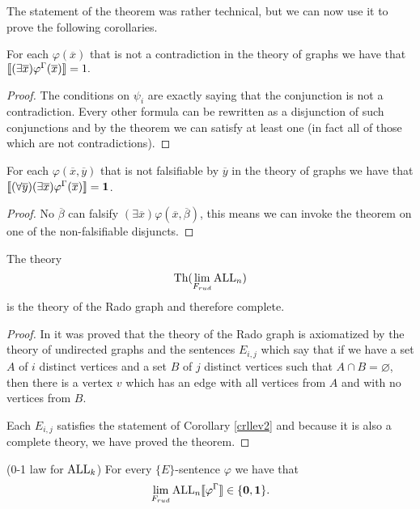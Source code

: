 The statement of the theorem was rather technical, but we can now use it to prove the following corollaries.

\begin{crll}For each $\varphi(\overline x)$ that is not a contradiction in the theory of graphs we have that $\llbracket(\exists \overline x)\varphi^\Gamma(\overline x)\rrbracket=1.$
\end{crll}
\begin{proof}
The conditions on $\psi_i$ are exactly saying that the conjunction is not a contradiction. Every other formula can be rewritten as a disjunction of such conjunctions and by the theorem we can satisfy at least one (in fact all of those which are not contradictions).
\end{proof}
\begin{crll}\label{crllev2}
For each $\varphi(\overline x,\overline y)$ that is not falsifiable by $\overline y$ in the theory of graphs we have that $\llbracket(\forall \overline y)(\exists \overline x)\varphi^\Gamma(\overline x)\rrbracket=\textbf{1}$.
\end{crll}
\begin{proof}
No $\overline \beta$ can falsify $(\exists \overline x)\varphi(\overline x,\overline \beta)$, this means we can invoke the theorem on one of the non-falsifiable disjuncts.
\end{proof}

\begin{thrm}\label{thrmall}
The theory \[\text{Th}(\lim_{F_{rud}}\text{ALL}_n)\] is the theory of the Rado graph and therefore complete.
\end{thrm}
\begin{proof}
In \cite{gaifman1964rado} it was proved that the theory of the Rado graph is axiomatized by the theory of undirected graphs and the sentences $E_{i,j}$ which say that if we have a set $A$ of $i$ distinct vertices and a set $B$ of $j$ distinct vertices such that $A\cap B=\varnothing$, then there is a vertex $v$ which has an edge with all vertices from $A$ and with no vertices from $B$.

Each $E_{i,j}$ satisfies the statement of Corollary \ref{crllev2} and because it is also a complete theory, we have proved the theorem.
\end{proof}

\begin{crll}(0-1 law for $\text{ALL}_k$)
For every $\{E\}$-sentence $\varphi$ we have that
\[\lim_{F_{rud}}\text{ALL}_n\llbracket\varphi^\Gamma\rrbracket\in\{\textbf{0},\textbf{1}\}.\]
\end{crll}


